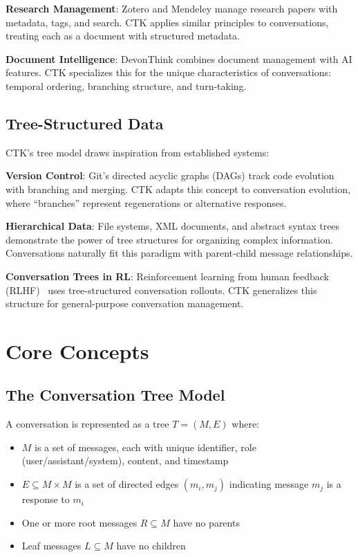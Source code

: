 \documentclass[11pt,letterpaper]{article}
\begin{document}
\textbf{Research Management}: Zotero and Mendeley manage research papers with metadata, tags, and search. CTK applies similar principles to conversations, treating each as a document with structured metadata.

\textbf{Document Intelligence}: DevonThink combines document management with AI features. CTK specializes this for the unique characteristics of conversations: temporal ordering, branching structure, and turn-taking.

\subsection{Tree-Structured Data}

CTK's tree model draws inspiration from established systems:

\textbf{Version Control}: Git's directed acyclic graphs (DAGs) track code evolution with branching and merging. CTK adapts this concept to conversation evolution, where ``branches'' represent regenerations or alternative responses.

\textbf{Hierarchical Data}: File systems, XML documents, and abstract syntax trees demonstrate the power of tree structures for organizing complex information. Conversations naturally fit this paradigm with parent-child message relationships.

\textbf{Conversation Trees in RL}: Reinforcement learning from human feedback (RLHF)~\cite{rlhf} uses tree-structured conversation rollouts. CTK generalizes this structure for general-purpose conversation management.

\section{Core Concepts}
\label{sec:concepts}

\subsection{The Conversation Tree Model}

A conversation is represented as a tree $T = (M, E)$ where:

\begin{itemize}
    \item $M$ is a set of messages, each with unique identifier, role (user/assistant/system), content, and timestamp
    \item $E \subseteq M \times M$ is a set of directed edges $(m_i, m_j)$ indicating message $m_j$ is a response to $m_i$
    \item One or more root messages $R \subseteq M$ have no parents
    \item Leaf messages $L \subseteq M$ have no children
\end{itemize}
\end{document}
